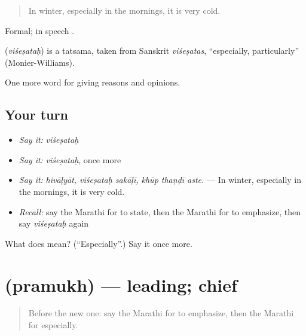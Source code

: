 \begin{quote}
In winter, especially in the mornings, it is very cold.
\end{quote}

Formal; in speech  .

\begin{cousinweb}
\textbf{} (\emph{viśeṣataḥ}) is a tatsama, taken from Sanskrit \emph{viśeṣatas}, \textquotedblleft{}especially, particularly\textquotedblright{} (Monier-Williams).
\end{cousinweb}

\begin{grammarlens}[title={What you've built}]
One more word for giving reasons and opinions.
\end{grammarlens}

\subsection*{Your turn}
\begin{itemize}
\raggedright
  \item \emph{Say it:} \emph{viśeṣataḥ}
  \item \emph{Say it:} \emph{viśeṣataḥ}, once more
  \item \emph{Say it:} \emph{hivāḷyāt, viśeṣataḥ sakāḷī, khūp thaṇḍī aste.} — In winter, especially in the mornings, it is very cold.
  \item \emph{Recall:} say the Marathi for to state, then the Marathi for to emphasize, then say \emph{viśeṣataḥ} again
\end{itemize}

\begin{tcolorbox}[breakable,colback=teal!4,colframe=teal!35!black,title={Before you move on}]
What does  mean? (\textquotedblleft{}Especially\textquotedblright{}.) Say it once more.
\end{tcolorbox}
\section[\texorpdfstring{\mr{प्रमुख} (pramukh)}{प्रमुख (pramukh)}]{ (pramukh) — leading; chief}

\label{lesson:MR-C352-pramukh}



\begin{quote}
Before the new one: say the Marathi for to emphasize, then the Marathi for especially.
\end{quote}

